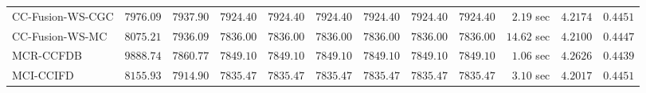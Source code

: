 \begin{table}[H]
\begin{tabular}{lrrrrrrrrrrr}
    CC-Fusion-WS-CGC & $      7976.09$ & $      7937.90$ & $      7924.40$ & $      7924.40$ & $      7924.40$ & $      7924.40$ & $      7924.40$ & $      7924.40$ & $         2.19$ sec    & $       4.2174$  & $       0.4451$ \\ 
     CC-Fusion-WS-MC & $      8075.21$ & $      7936.09$ & $      7836.00$ & $      7836.00$ & $      7836.00$ & $      7836.00$ & $      7836.00$ & $      7836.00$ & $        14.62$ sec    & $       4.2100$  & $       0.4447$ \\ 
\cmidrule{1-1} 
           MCR-CCFDB & $      9888.74$ & $      7860.77$ & $      7849.10$ & $      7849.10$ & $      7849.10$ & $      7849.10$ & $      7849.10$ & $      7849.10$ & $         1.06$ sec    & $       4.2626$  & $       0.4439$ \\ 
\cmidrule{1-1} 
           MCI-CCIFD & $      8155.93$ & $      7914.90$ & $      7835.47$ & $      7835.47$ & $      7835.47$ & $      7835.47$ & $      7835.47$ & $      7835.47$ & $         3.10$ sec    & $       4.2017$  & $       0.4451$ \\ 
\bottomrule
\end{tabular}
\end{table}

